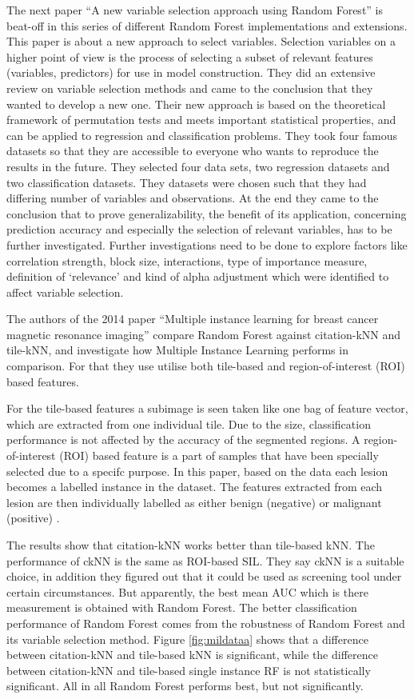 \documentclass{sig-alternate-05-2015}
\begin{document}
The next paper ``A new variable selection approach using Random Forest'' \cite{hapfelmeier2013new} is beat-off in this series of different Random Forest implementations and extensions. This paper is about a new approach to select variables. Selection variables on a higher point of view is the process of selecting a subset of relevant features (variables, predictors) for use in model construction. They did an extensive review on variable selection methods and came to the conclusion that they wanted to develop a new one. Their new approach is based on the theoretical framework of permutation tests and meets important statistical properties, and can be applied to regression and classification problems. They took four famous datasets so that they are accessible to everyone who wants to reproduce the results in the future. They selected four data sets, two regression datasets and two classification datasets. They datasets were chosen such that they had differing number of variables and observations. At the end they came to the conclusion that to prove generalizability, the benefit of its application, concerning prediction accuracy and especially the selection of relevant variables, has to be further investigated. Further investigations need to be done to explore factors like correlation strength, block size, interactions, type of importance measure, definition of `relevance' and kind of alpha adjustment which were identified to affect variable selection. 

The authors of the 2014  paper ``Multiple instance learning for breast cancer magnetic resonance imaging'' \cite{maken2014multiple} compare Random Forest against citation-kNN and tile-kNN, and investigate how Multiple Instance Learning performs in comparison. For that they use utilise both tile-based  and region-of-interest  (ROI)  based features. 

For the tile-based features  a subimage is seen taken like one bag of feature vector, which are extracted from one individual tile. Due to the size, classification performance is not affected by the accuracy of the segmented regions. A region-of-interest  (ROI)  based feature is a part of samples that have been specially selected due to a specifc purpose. In this paper, based on the data each lesion becomes a labelled instance in the dataset. The features extracted from each lesion are then individually labelled as either benign (negative) or malignant (positive)  \cite{maken2014multiple}. 

The results show that citation-kNN works better than tile-based kNN. The performance of ckNN is the same as ROI-based SIL. They say ckNN is a suitable choice, in addition they figured out that it could be used as screening tool under certain circumstances. But apparently, the best mean AUC which is there measurement is obtained with Random Forest. The better classification performance of Random Forest comes from the robustness of Random Forest and its variable selection method. Figure \ref{fig:mildataa} shows that a difference  between  citation-kNN  and  tile-based  kNN is significant, while the  difference between citation-kNN  and  tile-based   single   instance   RF   is   not   statistically   significant.   All in all Random Forest performs best, but not significantly.
\end{document}
